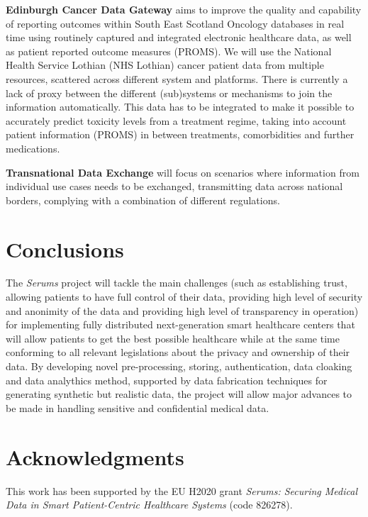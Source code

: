 \documentclass[sigconf]{acmart}
\begin{document}
\textbf{Edinburgh Cancer Data Gateway} aims to improve the quality and capability of reporting outcomes within South East Scotland Oncology databases in real time using routinely captured and integrated electronic healthcare data, as well as patient reported outcome measures (PROMS). We will use the National Health Service Lothian (NHS Lothian) cancer patient data from multiple resources, scattered across different system and platforms. There is currently a lack of proxy between the different (sub)systems or mechanisms to join the information automatically. This data has to be integrated to make it possible to accurately predict toxicity levels from a treatment regime, taking into account patient information (PROMS) in between treatments, comorbidities and further medications.

\textbf{Transnational Data Exchange} will focus on scenarios where information from individual use cases needs to be exchanged, transmitting data across national borders, complying with a combination of different regulations.

\section{Conclusions}

The \emph{Serums} project will tackle the main challenges (such as establishing trust, allowing patients to have full control of their data, providing high level of security and anonimity of the data and providing high level of transparency in operation) for implementing fully distributed next-generation smart healthcare centers that will allow patients to get the best possible healthcare while at the same time conforming to all relevant legislations about the privacy and ownership of their data. By developing novel pre-processing, storing, authentication, data cloaking and data analythics method, supported by data fabrication techniques for generating synthetic but realistic data, the project will allow major advances to be made in handling sensitive and confidential medical data.

\section*{Acknowledgments}
This work has been supported by the EU H2020 grant \emph{Serums: Securing Medical Data in Smart Patient-Centric Healthcare Systems} (code 826278).
\end{document}
